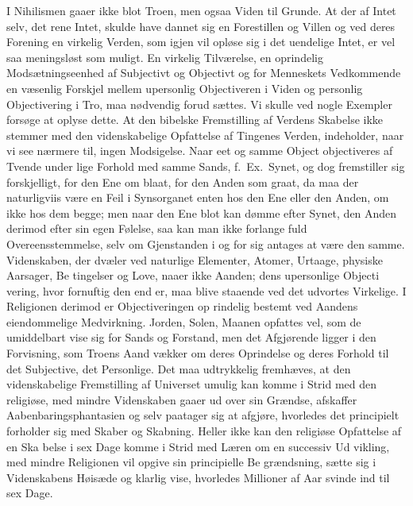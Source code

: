 \documentclass[12pt,a4paper]{article}
\newcommand{\opage}[1]{\marginnote{\footnotesize\textit{[#1]}}}
\begin{document}
I Nihilismen gaaer ikke blot Troen, men ogsaa Viden til
Grunde. At der af Intet selv, det rene Intet, skulde have dannet
sig en Forestillen og Villen og ved deres Forening en virkelig
Verden, som igjen vil opløse sig i det uendelige Intet, er vel saa
meningsløst som muligt. En virkelig Tilværelse, en oprindelig
Modsætningseenhed af Subjectivt og Objectivt og for Menneskets
Vedkommende en væsenlig Forskjel mellem upersonlig Objectiveren
i Viden og personlig Objectivering i Tro, maa nødvendig forud\-%
sættes. Vi skulle ved nogle Exempler forsøge at oplyse dette.
At den bibelske Fremstilling af Verdens Skabelse ikke stemmer
med den videnskabelige Opfattelse af Tingenes Verden, indeholder,
naar vi see nærmere til, ingen Modsigelse. Naar eet og samme
Object objectiveres af Tvende under lige Forhold med samme
Sands, f.\ Ex.\ Synet, og dog fremstiller sig forskjelligt, for den Ene
om blaat, for den Anden som graat, da maa der naturligviis være
en Feil i Synsorganet enten hos den Ene eller den Anden, om
ikke hos dem begge; men naar den Ene blot kan dømme efter
Synet, den Anden derimod efter sin egen Følelse, saa kan man
ikke forlange fuld Overeensstemmelse, selv om Gjenstanden i og
for sig antages at være den samme. Videnskaben, der dvæler
ved naturlige Elementer, Atomer, Urtaage, physiske Aarsager, Be\-%
tingelser og Love, naaer ikke Aanden; dens upersonlige Objecti\-%
vering, hvor fornuftig den end er, maa blive staaende ved det
udvortes Virkelige. I Religionen derimod er Objectiveringen op\-%
rindelig bestemt ved Aandens eiendommelige Medvirkning. Jorden,
Solen, Maanen opfattes vel, som de umiddelbart vise sig for Sands
og Forstand, men det Afgjørende ligger i den Forvisning, som
Troens Aand vækker om deres Oprindelse og deres Forhold til
\opage{50}det Subjective, det Personlige. Det maa udtrykkelig fremhæves,
at den videnskabelige Fremstilling af Universet umulig kan komme
i Strid med den religiøse, med mindre Videnskaben gaaer ud over
sin Grændse, afskaffer Aabenbaringsphantasien og selv paatager
sig at afgjøre, hvorledes det principielt forholder sig med Skaber
og Skabning. Heller ikke kan den religiøse Opfattelse af en Ska\-%
belse i sex Dage komme i Strid med Læren om en successiv Ud\-%
vikling, med mindre Religionen vil opgive sin principielle Be\-%
grændsning, sætte sig i Videnskabens Høisæde og klarlig vise,
hvorledes Millioner af Aar svinde ind til sex Dage.
\end{document}
